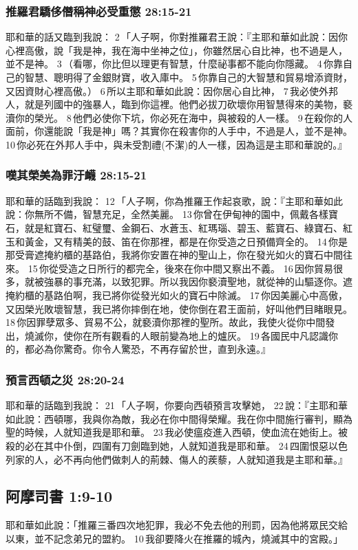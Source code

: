 \subsubsection{推羅君驕侈僭稱神必受重懲 28:15-21}
耶和華的話又臨到我說： 2 「人子啊，你對推羅君王說：『主耶和華如此說：因你心裡高傲，說「我是神，我在海中坐神之位」，你雖然居心自比神，也不過是人，並不是神。 3 （看哪，你比但以理更有智慧，什麼祕事都不能向你隱藏。 4 你靠自己的智慧、聰明得了金銀財寶，收入庫中。 5 你靠自己的大智慧和貿易增添資財，又因資財心裡高傲。） 6 所以主耶和華如此說：因你居心自比神， 7 我必使外邦人，就是列國中的強暴人，臨到你這裡。他們必拔刀砍壞你用智慧得來的美物，褻瀆你的榮光。 8 他們必使你下坑，你必死在海中，與被殺的人一樣。 9 在殺你的人面前，你還能說「我是神」嗎？其實你在殺害你的人手中，不過是人，並不是神。 10 你必死在外邦人手中，與未受割禮(不潔)的人一樣，因為這是主耶和華說的。』

\subsubsection{嘆其榮美為罪汙衊 28:15-21}
耶和華的話臨到我說： 12 「人子啊，你為推羅王作起哀歌，說：『主耶和華如此說：你無所不備，智慧充足，全然美麗。 13 你曾在伊甸神的園中，佩戴各樣寶石，就是紅寶石、紅璧璽、金鋼石、水蒼玉、紅瑪瑙、碧玉、藍寶石、綠寶石、紅玉和黃金，又有精美的鼓、笛在你那裡，都是在你受造之日預備齊全的。 14 你是那受膏遮掩約櫃的基路伯，我將你安置在神的聖山上，你在發光如火的寶石中間往來。 15 你從受造之日所行的都完全，後來在你中間又察出不義。 16 因你貿易很多，就被強暴的事充滿，以致犯罪。所以我因你褻瀆聖地，就從神的山驅逐你。遮掩約櫃的基路伯啊，我已將你從發光如火的寶石中除滅。 17 你因美麗心中高傲，又因榮光敗壞智慧，我已將你摔倒在地，使你倒在君王面前，好叫他們目睹眼見。 18 你因罪孽眾多、貿易不公，就褻瀆你那裡的聖所。故此，我使火從你中間發出，燒滅你，使你在所有觀看的人眼前變為地上的爐灰。 19 各國民中凡認識你的，都必為你驚奇。你令人驚恐，不再存留於世，直到永遠。』


\subsubsection{預言西頓之災 28:20-24}
耶和華的話臨到我說： 21 「人子啊，你要向西頓預言攻擊她， 22 說：『主耶和華如此說：西頓哪，我與你為敵，我必在你中間得榮耀。我在你中間施行審判，顯為聖的時候，人就知道我是耶和華。 23 我必使瘟疫進入西頓，使血流在她街上。被殺的必在其中仆倒，四圍有刀劍臨到她，人就知道我是耶和華。 24 四圍恨惡以色列家的人，必不再向他們做刺人的荊棘、傷人的蒺藜，人就知道我是主耶和華。』

\subsection{阿摩司書 1:9-10}
耶和華如此說：「推羅三番四次地犯罪，我必不免去他的刑罰，因為他將眾民交給以東，並不記念弟兄的盟約。 10 我卻要降火在推羅的城內，燒滅其中的宮殿。」

